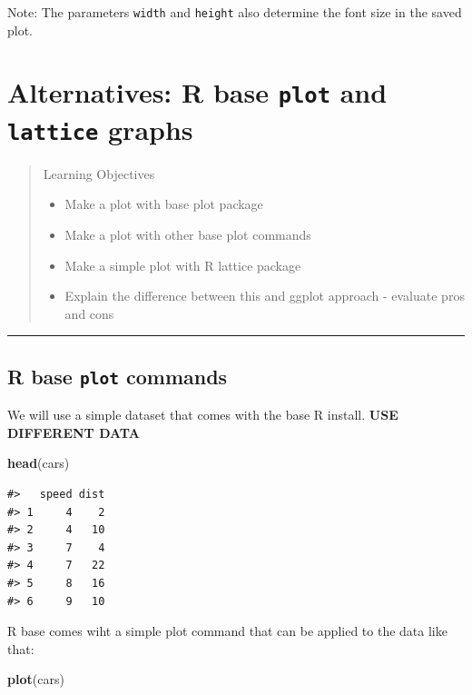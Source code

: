 \documentclass[]{book}
\newenvironment{Shaded}{\begin{snugshade}}{\end{snugshade}}
\newcommand{\KeywordTok}[1]{\textcolor[rgb]{0.13,0.29,0.53}{\textbf{#1}}}
\newcommand{\NormalTok}[1]{#1}
\providecommand{\tightlist}{%
  \setlength{\itemsep}{0pt}\setlength{\parskip}{0pt}}
\theoremstyle{definition}
\theoremstyle{definition}
\theoremstyle{definition}
\theoremstyle{remark}
\begin{document}
Note: The parameters \texttt{width} and \texttt{height} also determine
the font size in the saved plot.

\chapter{\texorpdfstring{Alternatives: R base \texttt{plot} and
\texttt{lattice}
graphs}{Alternatives: R base plot and lattice graphs}}\label{baseplot}

\begin{quote}
Learning Objectives

\begin{itemize}
\tightlist
\item
  Make a plot with base plot package
\item
  Make a plot with other base plot commands
\item
  Make a simple plot with R lattice package
\item
  Explain the difference between this and ggplot approach - evaluate
  pros and cons
\end{itemize}
\end{quote}

\begin{center}\rule{0.5\linewidth}{\linethickness}\end{center}

\section{\texorpdfstring{R base \texttt{plot}
commands}{R base plot commands}}\label{r-base-plot-commands}

We will use a simple dataset that comes with the base R install.
\textbf{USE DIFFERENT DATA}

\begin{Shaded}
\begin{Highlighting}[]
\KeywordTok{head}\NormalTok{(cars)}
\end{Highlighting}
\end{Shaded}

\begin{verbatim}
#>   speed dist
#> 1     4    2
#> 2     4   10
#> 3     7    4
#> 4     7   22
#> 5     8   16
#> 6     9   10
\end{verbatim}

R base comes wiht a simple plot command that can be applied to the data
like that:

\begin{Shaded}
\begin{Highlighting}[]
\KeywordTok{plot}\NormalTok{(cars)}
\end{Highlighting}
\end{Shaded}
\end{document}

